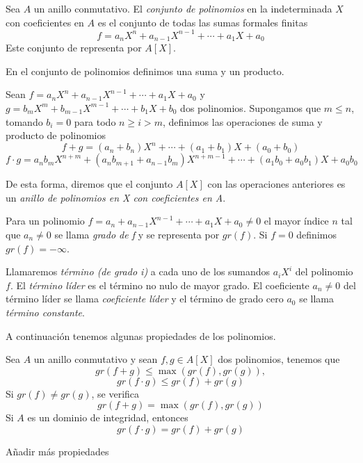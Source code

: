 \begin{definition}
    Sea $A$ un anillo conmutativo. El \emph{conjunto de polinomios} en la indeterminada $X$ con coeficientes en $A$ es el conjunto de 
    todas las sumas formales finitas
    $$f = a_n X^n + a_{n-1} X^{n-1} + \cdots + a_1 X + a_0$$
    Este conjunto de representa por $A[X]$.
\end{definition}

En el conjunto de polinomios definimos una suma y un producto. 

Sean $f = a_n X^n + a_{n-1} X^{n-1} + \cdots + a_1 X + a_0$ y $g = b_m X^m + b_{m-1} X^{m-1} + \cdots + b_1 X + b_0$
dos polinomios. Supongamos que $m \leq n$, tomando $b_i = 0$ para todo $n \geq i > m$, definimos las operaciones de suma y producto de polinomios
$$f + g = (a_n + b_n)X^n + \cdots + (a_1 + b_1)X + (a_0 + b_0)$$
$$f \cdot g = a_n b_m X^{n+m} + (a_n b_{m+1} + a_{n-1} b_m) X^{n+m-1} + \cdots + (a_1 b_0 + a_0 b_1)X + a_0 b_0$$

De esta forma, diremos que el conjunto $A[X]$ con las operaciones anteriores es un \emph{anillo de polinomios en X con coeficientes en A}.

\begin{definition}
    Para un polinomio $f = a_n + a_{n-1} X^{n-1} + \cdots + a_1 X + a_0 \neq 0$ el mayor índice $n$ tal que $a_n \neq 0$ se llama \emph{grado de f}
    y se representa por $gr(f)$. Si $f = 0$ definimos $gr(f) = - \infty$.

    Llamaremos \emph{término (de grado i)} a cada uno de los sumandos $a_i X^i$ del polinomio $f$. El \emph{término líder}
    es el término no nulo de mayor grado. El coeficiente $a_n \neq 0$ del término líder se llama \emph{coeficiente líder} 
    y el término de grado cero $a_0$ se llama \emph{término constante}.
\end{definition}

A continuación tenemos algunas propiedades de los polinomios.

\begin{proposition}
    Sea $A$ un anillo conmutativo y sean $f,g \in A[X]$ dos polinomios, tenemos que 
    $$gr(f + g) \leq \max{(gr(f), gr(g))},$$
    $$gr(f \cdot g) \leq gr(f) + gr(g)$$
    Si $gr(f) \neq gr(g)$, se verifica 
    $$gr(f + g) = \max{(gr(f), gr(g))}$$
    Si $A$ es un dominio de integridad, entonces
    $$gr(f \cdot g) = gr(f) + gr(g)$$
\end{proposition}

Añadir más propiedades


